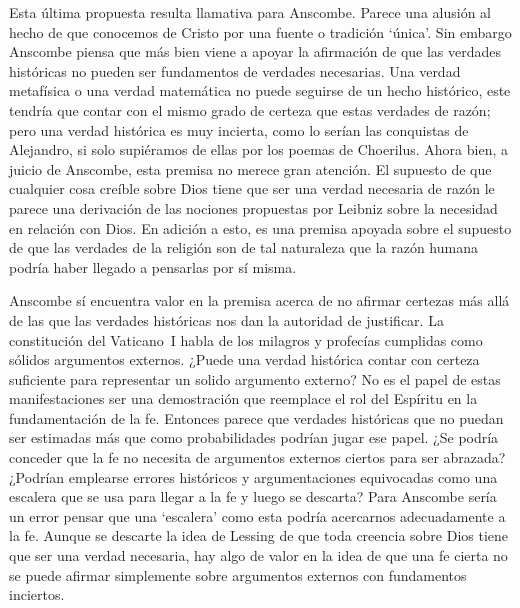 Esta última propuesta resulta llamativa para Anscombe. Parece una alusión al hecho de que conocemos de Cristo por una fuente o tradición `única'. Sin embargo Anscombe piensa que más bien viene a apoyar la afirmación de que las verdades históricas no pueden ser fundamentos de verdades necesarias. Una verdad metafísica o una verdad matemática no puede seguirse de un hecho histórico, este tendría que contar con el mismo grado de certeza que estas verdades de razón; pero una verdad histórica es muy incierta, como lo serían las conquistas de Alejandro, si solo supiéramos de ellas por los poemas de Choerilus. Ahora bien, a juicio de Anscombe, esta premisa no merece gran atención. El supuesto de que cualquier cosa creíble sobre Dios tiene que ser una verdad necesaria de razón le parece una derivación de las nociones propuestas por Leibniz sobre la necesidad en relación con Dios. En adición a esto, es una premisa apoyada sobre el supuesto de que las verdades de la religión son de tal naturaleza que la razón humana podría haber llegado a pensarlas por sí misma.

Anscombe sí encuentra valor en la premisa acerca de no afirmar certezas más allá de las que las verdades históricas nos dan la autoridad de justificar. La constitución del Vaticano~I habla de los milagros y profecías cumplidas como sólidos argumentos externos. ¿Puede una verdad histórica contar con certeza suficiente para representar un solido argumento externo? No es el papel de estas manifestaciones ser una demostración que reemplace el rol del Espíritu en la fundamentación de la fe. Entonces parece que verdades históricas que no puedan ser estimadas más que como probabilidades podrían jugar ese papel. ¿Se podría conceder que la fe no necesita de argumentos externos ciertos para ser abrazada? ¿Podrían emplearse errores históricos y argumentaciones equivocadas como una escalera que se usa para llegar a la fe y luego se descarta? Para Anscombe sería un error pensar que una `escalera' como esta podría acercarnos adecuadamente a la fe. Aunque se descarte la idea de Lessing de que toda creencia sobre Dios tiene que ser una verdad necesaria, hay algo de valor en la idea de que una fe cierta no se puede afirmar simplemente sobre argumentos externos con fundamentos inciertos.

